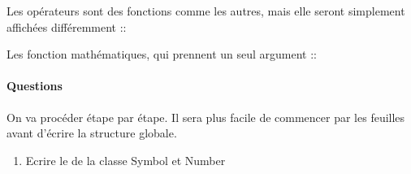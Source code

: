 \documentclass[letterpaper,10pt,english]{sphinxhowto}
\begin{document}
\begin{sphinxVerbatim}[commandchars=\\\{\}]
 
\end{sphinxVerbatim}

\sphinxAtStartPar
Les opérateurs sont des fonctions comme les autres, mais elle seront simplement affichées différemment ::

\begin{sphinxVerbatim}[commandchars=\\\{\}]
 

 

 

 
\end{sphinxVerbatim}

\sphinxAtStartPar
Les fonction mathématiques, qui prennent un seul argument ::

\begin{sphinxVerbatim}[commandchars=\\\{\}]
 

 
\end{sphinxVerbatim}


\paragraph{Questions}
\label{\detokenize{cours6_objet_corr_exercices:questions}}
\sphinxAtStartPar
On va procéder étape par étape. Il sera plus facile de commencer par les feuilles avant d’écrire la structure globale.
\begin{enumerate}
%
\item {} 
\sphinxAtStartPar
Ecrire le  de la classe Symbol et Number

\end{enumerate}
\end{document}
